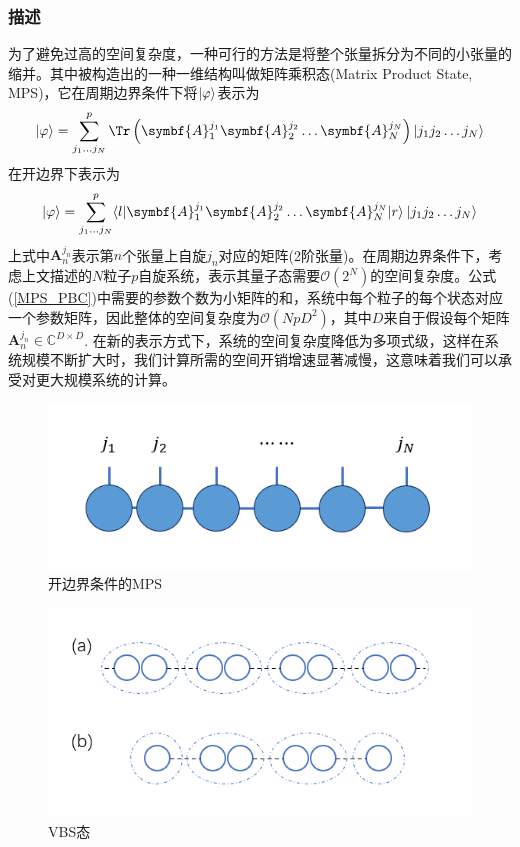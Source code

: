 \subsubsection{描述}

为了避免过高的空间复杂度，一种可行的方法是将整个张量拆分为不同的小张量的缩并。其中被构造出的一种一维结构叫做矩阵乘积态(Matrix Product State, MPS)，它在周期边界条件下将$\lvert\varphi\rangle$表示为
\begin{equation}\label{MPS_PBC}
\ket{\varphi} = \sum_{j_1\dots j_N}^p \Tr\left( \symbf{A}_{1}^{j_1} \symbf{A}_{2}^{j_2}\dots \symbf{A}_{N}^{j_N} \right)\ket{j_1 j_2\dots j_N}
\end{equation}
在开边界下表示为
\begin{equation}
\ket{\varphi} = \sum_{j_1\dots j_N}^p \bra{l} \symbf{A}_{1}^{j_1} \symbf{A}_{2}^{j_2}\dots \symbf{A}_{N}^{j_N}\ket{r} \:
\ket{j_1 j_2\dots j_N}
\end{equation}
上式中$\symbf{A}_n^{j_n}$表示第$n$个张量上自旋$j_n$对应的矩阵(2阶张量)。在周期边界条件下，考虑上文描述的$N$粒子$p$自旋系统，表示其量子态需要$\mathcal{O}\left(2^N\right)$的空间复杂度。公式(\ref{MPS_PBC})中需要的参数个数为小矩阵的和，系统中每个粒子的每个状态对应一个参数矩阵，因此整体的空间复杂度为$\mathcal{O}(NpD^2)$，其中$D$来自于假设每个矩阵$\symbf{A}_{n}^{j_n}\in \mathbb{C}^{D\times D}$. 在新的表示方式下，系统的空间复杂度降低为多项式级，这样在系统规模不断扩大时，我们计算所需的空间开销增速显著减慢，这意味着我们可以承受对更大规模系统的计算。
\begin{figure}[htb]
	\centering
	\includegraphics[width=1\textwidth]{image/smallTensors.png}
	\caption{开边界条件的MPS}
	\label{fig:MPS-OBC}
\end{figure}
\begin{figure}[htb]
	\centering
	\includegraphics[width=1\textwidth]{image/VBS_o_and_p.png}
	\caption{VBS态}
	\label{fig:VBS}
\end{figure}
